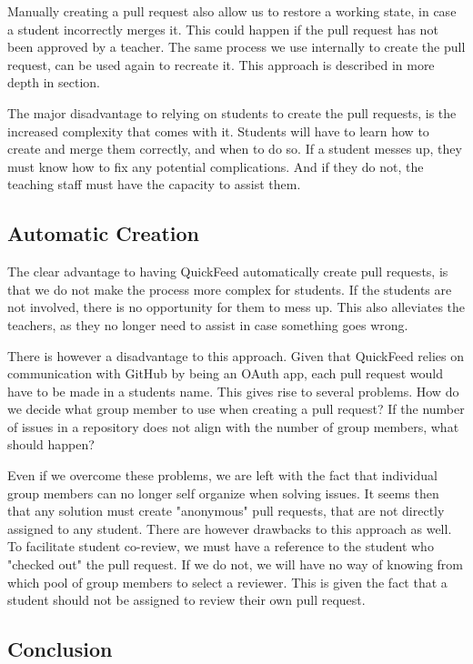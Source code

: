 Manually creating a pull request also allow us to restore a working state, in case a student incorrectly merges it.
This could happen if the pull request has not been approved by a teacher.
The same process we use internally to create the pull request, can be used again to recreate it.
This approach is described in more depth in section. %

The major disadvantage to relying on students to create the pull requests, is the increased complexity that comes with it.
Students will have to learn how to create and merge them correctly, and when to do so.
If a student messes up, they must know how to fix any potential complications.
And if they do not, the teaching staff must have the capacity to assist them.

\subsection{Automatic Creation}

The clear advantage to having QuickFeed automatically create pull requests, is that we do not make the process more complex for students.
If the students are not involved, there is no opportunity for them to mess up.
This also alleviates the teachers, as they no longer need to assist in case something goes wrong.

There is however a disadvantage to this approach.
Given that QuickFeed relies on communication with GitHub by being an OAuth app, each pull request would have to be made in a students name.
This gives rise to several problems.
How do we decide what group member to use when creating a pull request?
If the number of issues in a repository does not align with the number of group members, what should happen?

Even if we overcome these problems, we are left with the fact that individual group members can no longer self organize when solving issues.
It seems then that any solution must create "anonymous" pull requests, that are not directly assigned to any student.
There are however drawbacks to this approach as well.
To facilitate student co-review, we must have a reference to the student who "checked out" the pull request.
If we do not, we will have no way of knowing from which pool of group members to select a reviewer.
This is given the fact that a student should not be assigned to review their own pull request.

\subsection{Conclusion}

